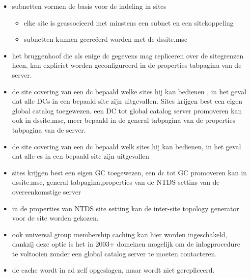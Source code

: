 \begin{itemize}
\item subnetten vormen de basis voor de indeling in sites
\begin{itemize}
\item elke site is geassocieerd met minstens een subnet en een sitekoppeling
\item subnetten kunnen gecre\"eerd worden met de dssite.msc
\end{itemize}


\item het bruggenhoof die als enige dc gegevens mag repliceren over de sitegrenzen heen, kan expliciet worden geconfigureerd in de properties tabpagina van de server.
\item de site covering van een dc bepaald welke sites hij kan bedienen , in het geval dat alle DCs in een bepaald site zijn uitgevallen.
Sites krijgen best een eigen global catalog toegewezen. een DC tot global catalog server promoveren kan ook in dssite.msc, meer bepaald in de general tabpagina van de properties tabpagina van de server.
\item de site covering van een dc bepaald welk sites hij kan bedienen, in het geval dat alle cs in een bepaald site zijn uitgevallen
\item sites krijgen best een eigen GC toegewezen, een dc tot GC promoveren kan in dssite.msc, general tabpagina,properties van de NTDS settins van de overeenkomstige server
\item in de properties van NTDS site setting kan de inter-site topology generator voor de site worden gekozen.
\item ook universal group membership caching kan hier worden ingeschakeld, dankzij deze optie is het in 2003+ domeinen mogelijk om de inlogprocedure te voltooien zonder een global catalog server te moeten contacteren.
\item de cache wordt in ad zelf opgeslagen, maar wordt niet gerepliceerd.
\end{itemize}